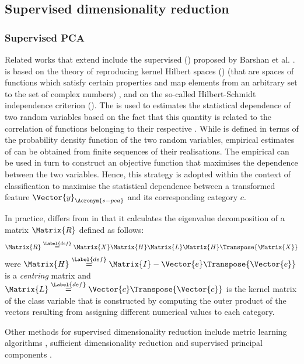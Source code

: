 \documentclass{article}
\def \newFea{\Vector{y}} 	%
\def \cat{c} 			%
\def \definition{\overset{\Label{def}}{=}}	%
\begin{document}
\subsection{Supervised dimensionality reduction}
\subsubsection{Supervised PCA}
Related works that extend  include the supervised  () proposed by Barshan et al. \cite{Barshan2011Su}.  is based on the theory of reproducing kernel Hilbert spaces () (that are spaces of functions which satisfy certain properties and map elements from an arbitrary set to the set of complex numbers) \cite{Aronszajn:1950}, and on the so-called Hilbert-Schmidt independence criterion ()\cite{gretton2005measuring}. The  is used to estimates the statistical dependence of two random variables based on the fact that this quantity is related to the correlation of functions belonging to their respective . While  is defined in terms of the probability density function of the two random variables,  empirical estimates of  can be obtained from finite sequences of their realisations. The empirical  can be used in turn to construct an objective function that maximises the dependence between the two variables. Hence, this strategy is adopted within the context of classification to maximise the statistical dependence between a transformed feature $\newFea_{\Acronym{s-pca}}$ and its corresponding category $\cat$.

In practice,  differs from  in that it calculates the eigenvalue decomposition of a matrix $\Matrix{R}$ defined as follows:
\begin{equation}
\Matrix{R} \definition \Matrix{X}\Matrix{H}\Matrix{L}\Matrix{H}\Transpose{\Matrix{X}}
\end{equation}
were $\Matrix{H} \definition \Matrix{I} - \Vector{e}\Transpose{\Vector{e}}$ is a \emph{centring} matrix and $\Matrix{L} \definition \Vector{\cat}\Transpose{\Vector{\cat}}$ is the kernel matrix of the class variable that is constructed by computing the outer product of the vectors resulting from assigning different numerical values to each category. 

Other methods for supervised dimensionality reduction include metric learning algorithms \cite{xing2002distance}, sufficient dimensionality reduction \cite{li1991sliced} and supervised principal components \cite{Bair06predictionby}.
\end{document}
